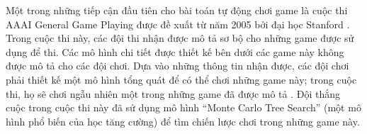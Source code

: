 Một trong những tiếp cận đầu tiên cho bài toán tự động chơi game là cuộc thi AAAI General Game Playing được đề xuất từ năm 2005 bởi đại học Stanford \cite{genesereth2005general}.
Trong cuộc thi này, các đội thi nhận được mô tả sơ bộ cho những game được sử dụng để thi.
Các mô hình chi tiết được thiết kế bên dưới các game này không được mô tả cho các đội chơi.
Dựa vào những thông tin nhận được, các đội chơi phải thiết kế một mô hình tổng quát để có thể chơi những game này; trong cuộc thi, họ sẽ chơi ngẫu nhiên một trong những game đã được mô tả \cite{genesereth2005general}.
Đội thắng cuộc trong cuộc thi này đã sử dụng mô hình ``Monte Carlo Tree Search'' (một mô hình phổ biến của học tăng cường) để tìm chiến lược chơi trong những game này.

